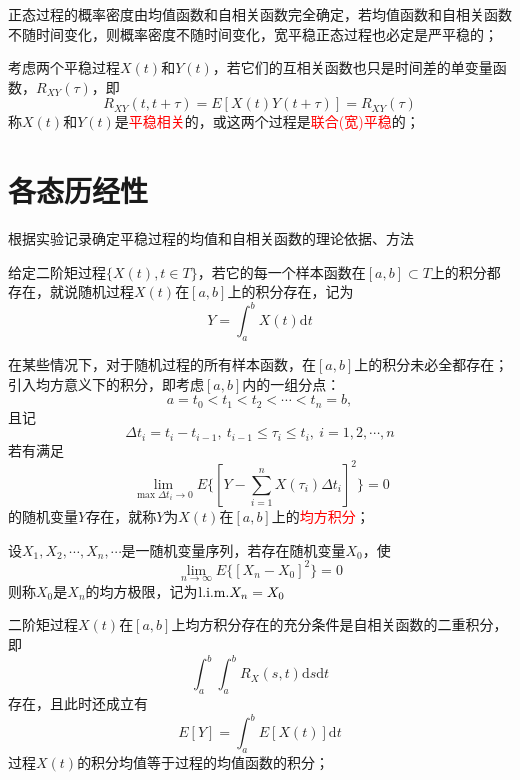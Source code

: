 \documentclass[12pt,a4paper]{article}
\newcommand{\dif}{\mathrm{d}}
\begin{document}
正态过程的概率密度由均值函数和自相关函数完全确定，若均值函数和自相关函数不随时间变化，则概率密度不随时间变化，宽平稳正态过程也必定是严平稳的；

考虑两个平稳过程$X(t)$和$Y(t)$，若它们的互相关函数也只是时间差的单变量函数，$R_{XY}(\tau)$，即
\begin{equation}
R_{XY}(t, t+\tau) = E[X(t)Y(t+\tau)] = R_{XY}(\tau)
\end{equation}
称$X(t)$和$Y(t)$是\textcolor{red}{平稳相关}的，或这两个过程是\textcolor{red}{联合(宽)平稳}的；

\section{各态历经性}
根据实验记录确定平稳过程的均值和自相关函数的理论依据、方法

给定二阶矩过程$\{X(t), t \in T\}$，若它的每一个样本函数在$[a, b] \subset T$上的积分都存在，就说随机过程$X(t)$在$[a, b]$上的积分存在，记为
\begin{equation}
Y = \int_a^b X(t) \dif t
\end{equation}

在某些情况下，对于随机过程的所有样本函数，在$[a, b]$上的积分未必全都存在；引入均方意义下的积分，即考虑$[a, b]$内的一组分点：
\begin{equation}
a = t_0 < t_1 < t_2 < \cdots < t_n = b, 
\end{equation}
且记
\begin{equation}
\Delta t_i = t_i -t_{i-1}, ~ t_{i-1} \leq \tau_i \leq t_i, ~ i = 1, 2, \cdots, n
\end{equation}
若有满足
\begin{equation}
\lim_{\max \Delta t_i \rightarrow 0} E\{[Y -\sum_{i=1}^n X(\tau_i) \Delta t_i]^2 \} = 0
\end{equation}
的随机变量$Y$存在，就称$Y$为$X(t)$在$[a, b]$上的\textcolor{red}{均方积分}；

设$X_1, X_2, \cdots, X_n, \cdots$是一随机变量序列，若存在随机变量$X_0$，使
\begin{equation}
\lim_{n\rightarrow \infty} E\{[X_n -X_0]^2\} = 0
\end{equation}
则称$X_0$是$X_n$的均方极限，记为${\rm l.i.m.} X_n = X_0$


二阶矩过程$X(t)$在$[a, b]$上均方积分存在的充分条件是自相关函数的二重积分，即
\begin{equation}
\int_a^b \int_a^b R_X(s, t) \dif s \dif t
\end{equation}
存在，且此时还成立有
\begin{equation}
E[Y] = \int_a^b E[X(t)] \dif t
\end{equation}
过程$X(t)$的积分均值等于过程的均值函数的积分；
\end{document}
